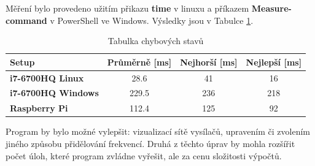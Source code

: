 \documentclass[12pt]{article}
\begin{document}
Měření bylo provedeno užitím přikazu \textbf{time} v linuxu a příkazem 
\textbf{Measure-command} v PowerShell ve Windows. Výsledky jsou v Tabulce
\ref{tab:time_tests}.
\begin{table}[H]
        \begin{tabular}{|l|c|c|c|}
                \hline
		\textbf{Setup} & \textbf{Průměrně [ms]} &
		\textbf{Nejhorší [ms]} & \textbf{Nejlepší [ms]}\\
                \hline
                \bf i7-6700HQ Linux & 28.6 & 41 & 16\\
		\hline
                \bf i7-6700HQ Windows & 229.5  & 236 & 218 \\
		\hline
                \bf Raspberry Pi & 112.4 & 125 & 92\\
		\hline
        \end{tabular}
        \caption{Tabulka chybových stavů}
        \label{tab:time_tests}
\end{table}

Program by bylo možné vylepšit: vizualizací sítě vysílačů, upravením či zvolením
jiného způsobu přidělování frekvencí. Druhá z těchto úprav by mohla rozšířit 
počet úloh, které program zvládne vyřešit, ale za cenu složitosti výpočtů.\\
\end{document}
